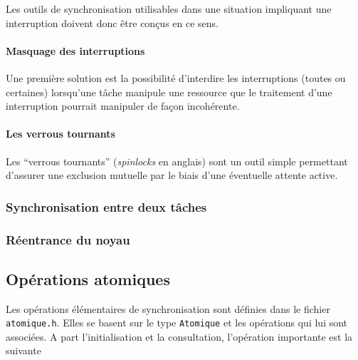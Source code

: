    Les outils de synchronisation utilisables dans une situation
impliquant une interruption doivent donc être conçus en ce sens.

%
%
%
\paragraph{Masquage des interruptions}

   Une première solution est la possibilité d'interdire les
interruptions (toutes ou certaines) lorsqu'une tâche manipule une
ressource que le traitement d'une interruption pourrait manipuler de
façon incohérente.

%
%
%
\paragraph{Les verrous tournants}

   Les ``verrous tournants'' ({\em spinlocks} en anglais) sont un
outil simple permettant d'assurer une exclusion mutuelle par le biais
d'une éventuelle attente active.
   
%
\subsubsection{Synchronisation entre deux tâches}

%
\subsubsection{Réentrance du noyau}

   

\subsection{Opérations atomiques}

   Les opérations élémentaires de synchronisation sont définies dans
le fichier {\tt atomique.h}. Elles se basent sur le type
\lstinline!Atomique! et les opérations qui lui sont associées. A part
l'initialisation et la consultation, l'opération importante est la
suivante

